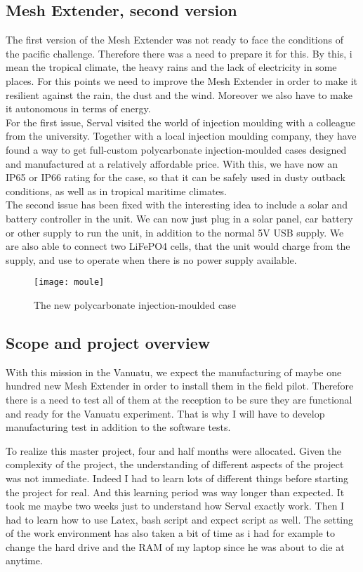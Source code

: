 \subsection{Mesh Extender, second version}
The first version of the Mesh Extender was not ready to face the conditions of the pacific challenge. Therefore there was a need to prepare it for this. By this, i mean the tropical climate, the heavy rains and the lack of electricity in some places. For this points we need to improve the Mesh Extender in order to make it resilient against the rain, the dust and the wind. Moreover we also have to make it autonomous in terms of energy. \\
For the first issue, Serval visited the world of injection moulding with a colleague from the university. Together with a local injection moulding company, they have found a way to get full-custom polycarbonate injection-moulded cases designed and manufactured at a relatively affordable price. With this, we have now an IP65 or IP66 rating for the case, so that it can be safely used in dusty outback conditions, as well as in tropical maritime climates.\\
The second issue has been fixed with the interesting idea to include a solar and battery controller in the unit. We can now just plug in a solar panel, car battery or other supply to run the unit, in addition to the normal 5V USB supply.  We are also able to connect two LiFePO4 cells, that the unit would charge from the supply, and use to operate when there is no power supply available. 
\begin{figure}[h]
\centering
\texttt{[image: moule]}
\caption{The new polycarbonate injection-moulded case}
\end{figure}

\subsection{Scope and project overview}
With this mission in the Vanuatu, we expect the manufacturing of maybe one hundred new Mesh Extender in order to install them in the field pilot. Therefore there is a need to test all of them at the reception to be sure they are functional and ready for the Vanuatu experiment. That is why I will have to develop manufacturing test in addition to the software tests. 
\par
To realize this master project, four and half months were allocated. Given the complexity of the project, the understanding of different aspects of the project was not immediate. Indeed I had to learn lots of different things before starting the project for real. And this learning period was way longer than expected. It took me maybe two weeks just to understand how Serval exactly work. Then I had to learn how to use Latex, bash script and expect script as well. The setting of the work environment has also taken a bit of time as i had for example to change the hard drive and the RAM of my laptop since he was about to die at anytime. 